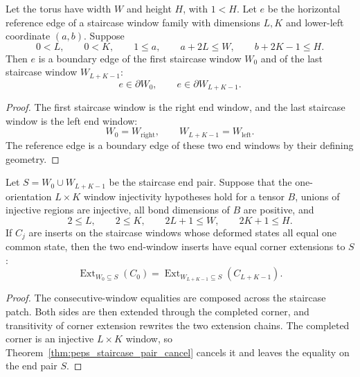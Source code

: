 \begin{theorem}
    \label{thm:peps_staircase_end_reference_edge_boundary}
    \leanok
    Let the torus have width $W$ and height $H$, with $1<H$.
    Let $e$ be the horizontal reference edge of a staircase window family with
    dimensions $L,K$ and lower-left coordinate $(a,b)$.  Suppose
    \[
        0<L,\qquad 0<K,\qquad 1\le a,\qquad
        a+2L\le W,\qquad b+2K-1\le H.
    \]
    Then $e$ is a boundary edge of the first staircase window $W_0$ and of the
    last staircase window $W_{L+K-1}$:
    \[
        e\in\partial W_0,
        \qquad
        e\in\partial W_{L+K-1}.
    \]
\end{theorem}
\begin{proof}
    \leanok
    The first staircase window is the right end window, and the last
    staircase window is the left end window:
    \[
        W_0=W_{\mathrm{right}},
        \qquad
        W_{L+K-1}=W_{\mathrm{left}}.
    \]
    The reference edge is a boundary edge of these two end windows by their
    defining geometry.
\end{proof}

\begin{theorem}
    \label{thm:peps_staircase_pair_insert_eq_open}
    \leanok
    Let $S=W_0\cup W_{L+K-1}$ be the staircase end pair.  Suppose that the
    one-orientation $L\times K$ window injectivity hypotheses hold for a
    tensor $B$, unions of injective regions are injective, all bond dimensions
    of $B$ are positive, and
    \[
        2\le L,\qquad 2\le K,\qquad
        2L+1\le W,\qquad 2K+1\le H.
    \]
    If $C_j$ are inserts on the staircase windows whose deformed states all
    equal one common state, then the two end-window inserts have equal corner
    extensions to $S$:
    \[
        \operatorname{Ext}_{W_0\subseteq S}(C_0)
        =
        \operatorname{Ext}_{W_{L+K-1}\subseteq S}(C_{L+K-1}).
    \]
\end{theorem}
\begin{proof}
    \leanok
    The consecutive-window equalities are composed across the staircase patch.
    Both sides are then extended through the completed corner, and
    transitivity of corner extension rewrites the two extension chains.  The
    completed corner is an injective $L\times K$ window, so
    Theorem~\ref{thm:peps_staircase_pair_cancel} cancels it and leaves the
    equality on the end pair $S$.
\end{proof}

